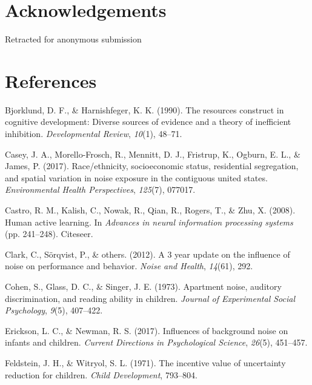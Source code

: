 \documentclass[10pt, letterpaper]{article}
\begin{document}
\hypertarget{acknowledgements}{%
\section{Acknowledgements}\label{acknowledgements}}

Retracted for anonymous submission

\hypertarget{references}{%
\section{References}\label{references}}

\setlength{\parindent}{-0.1in} 
\setlength{\leftskip}{0.125in}

\noindent

\hypertarget{refs}{}
\leavevmode\hypertarget{ref-bjorklund1990}{}%
Bjorklund, D. F., \& Harnishfeger, K. K. (1990). The resources construct
in cognitive development: Diverse sources of evidence and a theory of
inefficient inhibition. \emph{Developmental Review}, \emph{10}(1),
48--71.

\leavevmode\hypertarget{ref-casey2017}{}%
Casey, J. A., Morello-Frosch, R., Mennitt, D. J., Fristrup, K., Ogburn,
E. L., \& James, P. (2017). Race/ethnicity, socioeconomic status,
residential segregation, and spatial variation in noise exposure in the
contiguous united states. \emph{Environmental Health Perspectives},
\emph{125}(7), 077017.

\leavevmode\hypertarget{ref-castro2008}{}%
Castro, R. M., Kalish, C., Nowak, R., Qian, R., Rogers, T., \& Zhu, X.
(2008). Human active learning. In \emph{Advances in neural information
processing systems} (pp. 241--248). Citeseer.

\leavevmode\hypertarget{ref-clark20123}{}%
Clark, C., Sörqvist, P., \& others. (2012). A 3 year update on the
influence of noise on performance and behavior. \emph{Noise and Health},
\emph{14}(61), 292.

\leavevmode\hypertarget{ref-cohen1973}{}%
Cohen, S., Glass, D. C., \& Singer, J. E. (1973). Apartment noise,
auditory discrimination, and reading ability in children. \emph{Journal
of Experimental Social Psychology}, \emph{9}(5), 407--422.

\leavevmode\hypertarget{ref-erickson2017}{}%
Erickson, L. C., \& Newman, R. S. (2017). Influences of background noise
on infants and children. \emph{Current Directions in Psychological
Science}, \emph{26}(5), 451--457.

\leavevmode\hypertarget{ref-feldstein1971}{}%
Feldstein, J. H., \& Witryol, S. L. (1971). The incentive value of
uncertainty reduction for children. \emph{Child Development}, 793--804.
\end{document}
